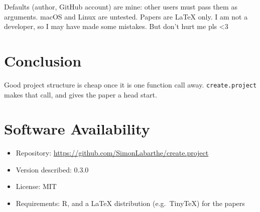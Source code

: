 \documentclass[11pt,a4paper]{article}
\begin{document}
Defaults (author, GitHub account) are mine: other users must pass them as arguments. macOS and Linux are untested. Papers are LaTeX only. I am not a developer, so I may have made some mistakes. But don't hurt me pls <3

\section{Conclusion}\label{sec:conclusion}

Good project structure is cheap once it is one function call away. \texttt{create.project} makes that call, and gives the paper a head start.

\section*{Software Availability}
\begin{itemize}[nosep]
    \item Repository: \url{https://github.com/SimonLabarthe/create.project}
    \item Version described: 0.3.0
    \item License: MIT
    \item Requirements: R, and a LaTeX distribution (e.g.\ TinyTeX) for the papers
\end{itemize}

\newpage
\printbibliography
\end{document}
